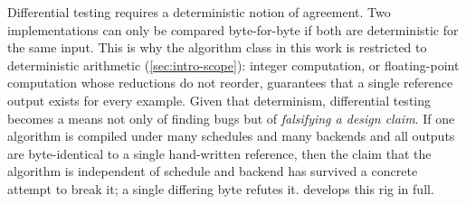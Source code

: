 Differential testing requires a deterministic notion of agreement. Two
implementations can only be compared byte-for-byte if both are deterministic for
the same input. This is why the algorithm class in this work is restricted to
deterministic arithmetic (\cref{sec:intro-scope}): integer computation, or
floating-point computation whose reductions do not reorder, guarantees that a
single reference output exists for every example. Given that determinism,
differential testing becomes a means not only of finding bugs but of
\emph{falsifying a design claim}. If one algorithm is compiled under many
schedules and many backends and all outputs are byte-identical to a single
hand-written reference, then the claim that the algorithm is independent of
schedule and backend has survived a concrete attempt to break it; a single
differing byte refutes it.  develops this rig in full.
